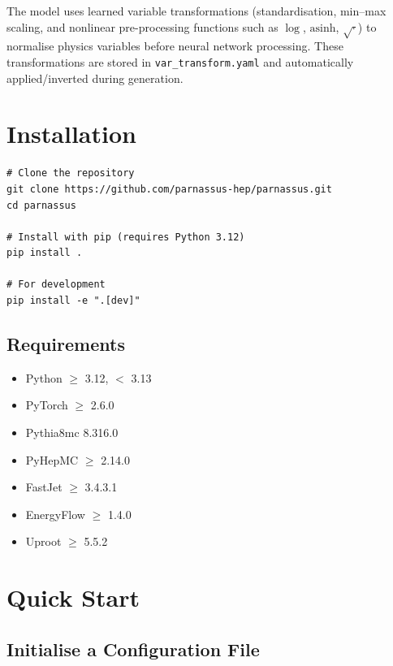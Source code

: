 \documentclass[11pt,a4paper]{article}
\begin{document}
The model uses learned variable transformations (standardisation, min--max scaling, and
nonlinear pre-processing functions such as $\log$, $\mathrm{asinh}$, $\sqrt{\cdot}$) to
normalise physics variables before neural network processing. These transformations are
stored in \texttt{var\_transform.yaml} and automatically applied/inverted during
generation.

\section{Installation}
\label{sec:installation}

\begin{lstlisting}[style=bash,caption={Installation commands.}]
# Clone the repository
git clone https://github.com/parnassus-hep/parnassus.git
cd parnassus

# Install with pip (requires Python 3.12)
pip install .

# For development
pip install -e ".[dev]"
\end{lstlisting}

\subsection{Requirements}

\begin{itemize}
  \item Python $\geq$ 3.12, $<$ 3.13
  \item PyTorch $\geq$ 2.6.0
  \item Pythia8mc 8.316.0
  \item PyHepMC $\geq$ 2.14.0
  \item FastJet $\geq$ 3.4.3.1
  \item EnergyFlow $\geq$ 1.4.0
  \item Uproot $\geq$ 5.5.2
\end{itemize}

\section{Quick Start}
\label{sec:quickstart}

\subsection{Initialise a Configuration File}
\end{document}
